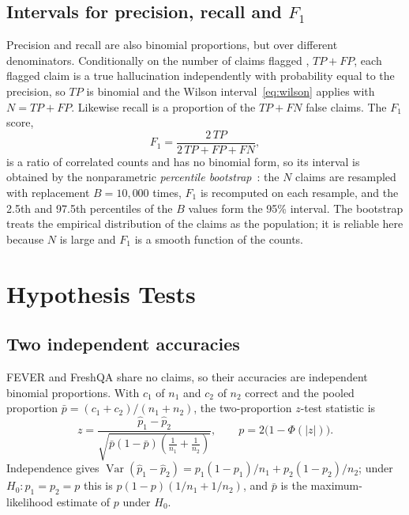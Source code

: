 \subsection{Intervals for precision, recall and \texorpdfstring{$F_1$}{F1}}
\label{sec:prf-intervals}

Precision and recall are also binomial proportions, but over different denominators. Conditionally on the number of claims flagged \Con, $TP + FP$, each flagged claim is a true hallucination independently with probability equal to the precision, so $TP$ is binomial and the Wilson interval~\eqref{eq:wilson} applies with $N = TP + FP$. Likewise recall is a proportion of the $TP + FN$ false claims. The $F_1$ score,
\[
  F_1 = \frac{2\,TP}{2\,TP + FP + FN},
\]
is a ratio of correlated counts and has no binomial form, so its interval is obtained by the nonparametric \emph{percentile bootstrap}~\citep{efron1993bootstrap}: the $N$ claims are resampled with replacement $B = 10{,}000$ times, $F_1$ is recomputed on each resample, and the 2.5th and 97.5th percentiles of the $B$ values form the 95\% interval. The bootstrap treats the empirical distribution of the claims as the population; it is reliable here because $N$ is large and $F_1$ is a smooth function of the counts.

\section{Hypothesis Tests}
\label{sec:tests}

\subsection{Two independent accuracies}

FEVER and FreshQA share no claims, so their accuracies are independent binomial proportions. With $c_1$ of $n_1$ and $c_2$ of $n_2$ correct and the pooled proportion $\bar{p} = (c_1 + c_2)/(n_1 + n_2)$, the two-proportion $z$-test statistic is
\begin{equation}
  z = \frac{\hat{p}_1 - \hat{p}_2}{\sqrt{\bar{p}(1-\bar{p})\left( \frac{1}{n_1} + \frac{1}{n_2} \right)}}, \qquad p = 2\bigl(1 - \Phi(\lvert z \rvert)\bigr).
\end{equation}
Independence gives $\operatorname{Var}(\hat{p}_1 - \hat{p}_2) = p_1(1-p_1)/n_1 + p_2(1-p_2)/n_2$; under $H_0 : p_1 = p_2 = p$ this is $p(1-p)(1/n_1 + 1/n_2)$, and $\bar{p}$ is the maximum-likelihood estimate of $p$ under $H_0$.

